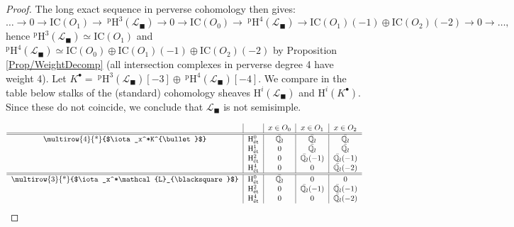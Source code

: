 \documentclass[11pt,english]{article}
\numberwithin{equation}{section}
\numberwithin{figure}{section}
\theoremstyle{definition}
\theoremstyle{plain}
\theoremstyle{remark}
\newcommand\HH{\mathrm{H}}
\newcommand\QQ{\mathbb{Q}}
\begin{document}
\begin{proof}
The long exact sequence in perverse cohomology then gives:\[
\ldots\rightarrow 0
\rightarrow \mathrm{IC}(O_{1})
\rightarrow\ ^{\mathrm{p}}\HH^3(\mathcal{L}_{\blacksquare})
\rightarrow 0
\rightarrow \mathrm{IC}(O_{0})
\rightarrow\ ^{\mathrm{p}}\HH^4(\mathcal{L}_{\blacksquare})
\rightarrow \mathrm{IC}(O_{1})(-1)\oplus\mathrm{IC}(O_{2})(-2)
\rightarrow 0
\rightarrow\ldots,
\]hence $^{\mathrm{p}}\HH^{3}(\mathcal{L}_{\blacksquare})\simeq\mathrm{IC}(O_{1})$
and $^{\mathrm{p}}\HH^{4}(\mathcal{L}_{\blacksquare})\simeq\mathrm{IC}(O_{0})\oplus\mathrm{IC}(O_{1})(-1)\oplus\mathrm{IC}(O_{2})(-2)$
by Proposition \ref{Prop/WeightDecomp} (all intersection complexes
in perverse degree 4 have weight 4). Let $K^{\bullet}=\ ^{\mathrm{p}}\HH^{3}(\mathcal{L}_{\blacksquare})[-3]\oplus\ ^{\mathrm{p}}\HH^{4}(\mathcal{L}_{\blacksquare})[-4]$.
We compare in the table below stalks of the (standard) cohomology
sheaves $\HH^{i}(\mathcal{L}_{\blacksquare})$ and $\HH^{i}(K^{\bullet})$.
Since these do not coincide, we conclude that $\mathcal{L}_{\blacksquare}$
is not semisimple.

\[
\begin{tabular}{c|c|c|c|c}
 & & $x\in O_0$ & $x\in O_1$ & $x\in O_2$ \\
\hline
\hline
\multirow{4}{*}{$\iota_x^*K^{\bullet}$} & $\HH_{\mathrm{\acute{e}t}}^0$ & $\bar{\QQ_l}$ & $\bar{\QQ_l}$ & $\bar{\QQ_l}$ \\
 & $\HH_{\mathrm{\acute{e}t}}^1$ & $0$ & $\bar{\QQ_l}$ & $\bar{\QQ_l}$ \\
 & $\HH_{\mathrm{\acute{e}t}}^2$ & $0$ & $\bar{\QQ_l}(-1)$ & $\bar{\QQ_l}(-1)$ \\
 & $\HH_{\mathrm{\acute{e}t}}^4$ & $0$ & $0$ & $\bar{\QQ_l}(-2)$ \\
\hline
\hline
\multirow{3}{*}{$\iota_x^*\mathcal{L}_{\blacksquare}$} & $\HH_{\mathrm{\acute{e}t}}^0$ & $\bar{\QQ_l}$ & $0$ & $0$ \\
 & $\HH_{\mathrm{\acute{e}t}}^2$ & $0$ & $\bar{\QQ_l}(-1)$ & $\bar{\QQ_l}(-1)$ \\
 & $\HH_{\mathrm{\acute{e}t}}^4$ & $0$ & $0$ & $\bar{\QQ_l}(-2)$
\end{tabular}
\]\end{proof}
\end{document}
